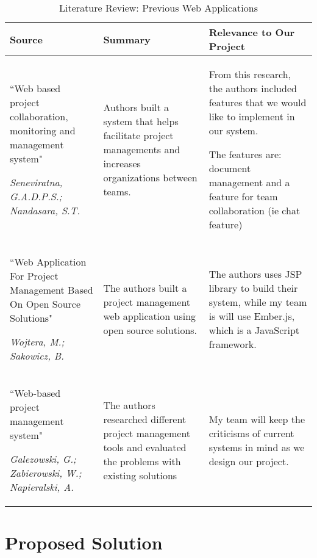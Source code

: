\begin{table}%
\caption{Literature Review: Previous Web Applications}\label{PreviousWebAppLitReview}
\begin{tabularx}{\textwidth}{|X|X|X|}
    \hline
    \textbf{Source} & \textbf{Summary} & \textbf{Relevance to Our Project}\\
    \hline  
    ``Web based project collaboration, monitoring and management system"
    \par \textit{Seneviratna, G.A.D.P.S.; Nandasara, S.T.} & Authors built a system that helps facilitate project managements and increases organizations between teams. & From this research, the authors included features that we would like to implement in our system. 
    \par The features are: document management and a feature for team collaboration (ie chat feature)\\
    \hline
    ``Web Application For Project Management Based On Open Source Solutions"
    \par \textit{ Wojtera, M.; Sakowicz, B.} & The authors built a project management web application using open source solutions. & The authors uses JSP library to build their system, while my team is will use Ember.js, which is a JavaScript framework.\\ 
    \hline
    ``Web-based project management system" 
    \par \textit{Galezowski, G.; Zabierowski, W.; Napieralski, A.} & The authors researched different project management tools and evaluated the problems with existing solutions & My team will keep the criticisms of current systems in mind as we design our project. \\
    \hline
\end{tabularx}
\end{table}
\FloatBarrier

\section{Proposed Solution}

